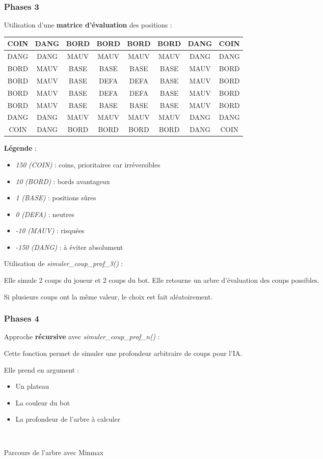 \documentclass[9pt]{beamer}
\begin{document}
\begin{frame}
  \frametitle{Phases 3}
  Utilisation d’une \textbf{matrice d’évaluation} des positions :

  \begin{tabular}{|c|c|c|c|c|c|c|c|}
    \hline
    COIN & DANG & BORD & BORD & BORD & BORD & DANG & COIN \\
    \hline
    DANG & DANG & MAUV & MAUV & MAUV & MAUV & DANG & DANG \\
    \hline
    BORD & MAUV & BASE & BASE & BASE & BASE & MAUV & BORD \\
    \hline
    BORD & MAUV & BASE & DEFA & DEFA & BASE & MAUV & BORD \\
    \hline
    BORD & MAUV & BASE & DEFA & DEFA & BASE & MAUV & BORD \\
    \hline
    BORD & MAUV & BASE & BASE & BASE & BASE & MAUV & BORD \\
    \hline
    DANG & DANG & MAUV & MAUV & MAUV & MAUV & DANG & DANG \\
    \hline
    COIN & DANG & BORD & BORD & BORD & BORD & DANG & COIN \\
    \hline
  \end{tabular}
  \textbf{Légende} :
  \begin{itemize}
    \item \textit{150 (COIN)} : coins, prioritaires car irréversibles
    \item \textit{10 (BORD)} : bords avantageux
    \item \textit{1 (BASE)} : positions sûres
    \item \textit{0 (DEFA)} : neutres
    \item \textit{-10 (MAUV)} : risquées
    \item \textit{-150 (DANG)} : à éviter absolument
  \end{itemize}
  Utilisation de \textit{simuler\_coup\_prof\_3()} :

Elle simule 2 coups du joueur et 2 coups du bot. Elle retourne un arbre d’évaluation des coups possibles.

Si plusieurs coups ont la même valeur, le choix est fait aléatoirement.
\end{frame}

\begin{frame}
  \frametitle{Phases 4}
  Approche \textbf{récursive} avec \textit{simuler\_coup\_prof\_n()} :

  Cette fonction permet de simuler une profondeur arbitraire de coups pour l’IA.

  Elle prend en argument :
  \begin{itemize}
    \item Un plateau
    \item La couleur du bot
    \item La profondeur de l’arbre à calculer
  \end{itemize}

  ~

  Parcours de l'arbre avec Minmax
\end{frame}
\end{document}
